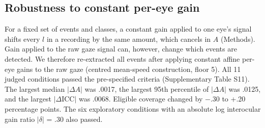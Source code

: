 

\subsection{Robustness to constant per-eye gain}

For a fixed set of events and classes, a constant gain applied to one eye's signal shifts every $l$ in a recording by the same amount, which cancels in $A$ (Methods). Gain applied to the raw gaze signal can, however, change which events are detected. We therefore re-extracted all events after applying constant affine per-eye gains to the raw gaze (centred mean-speed construction, floor 5). All 11 judged conditions passed the pre-specified criteria (Supplementary Table S11). The largest median $|\Delta A|$ was .0017, the largest 95th percentile of $|\Delta A|$ was .0125, and the largest $|\Delta\mathrm{ICC}|$ was .0068. Eligible coverage changed by $-$.30 to +.20 percentage points. The six exploratory conditions with an absolute log interocular gain ratio $|\delta|$ = .30 also passed.
